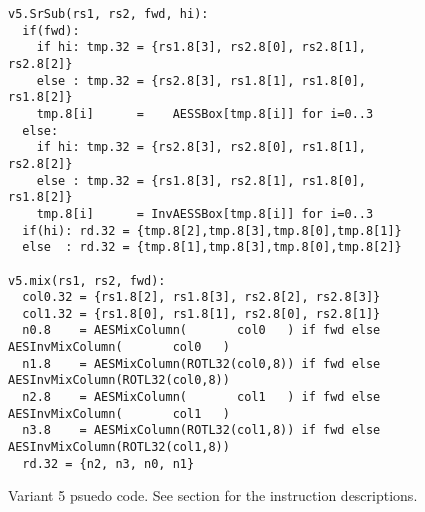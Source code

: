 \begin{figure}[!htb]
\begin{lstlisting}[language=pseudo,style=block]
v5.SrSub(rs1, rs2, fwd, hi):
  if(fwd):
    if hi: tmp.32 = {rs1.8[3], rs2.8[0], rs2.8[1], rs2.8[2]}
    else : tmp.32 = {rs2.8[3], rs1.8[1], rs1.8[0], rs1.8[2]}
    tmp.8[i]      =    AESSBox[tmp.8[i]] for i=0..3
  else:
    if hi: tmp.32 = {rs2.8[3], rs2.8[0], rs1.8[1], rs2.8[2]}
    else : tmp.32 = {rs1.8[3], rs2.8[1], rs1.8[0], rs1.8[2]}
    tmp.8[i]      = InvAESSBox[tmp.8[i]] for i=0..3
  if(hi): rd.32 = {tmp.8[2],tmp.8[3],tmp.8[0],tmp.8[1]}
  else  : rd.32 = {tmp.8[1],tmp.8[3],tmp.8[0],tmp.8[2]}

v5.mix(rs1, rs2, fwd):
  col0.32 = {rs1.8[2], rs1.8[3], rs2.8[2], rs2.8[3]}
  col1.32 = {rs1.8[0], rs1.8[1], rs2.8[0], rs2.8[1]}
  n0.8    = AESMixColumn(       col0   ) if fwd else AESInvMixColumn(       col0   )
  n1.8    = AESMixColumn(ROTL32(col0,8)) if fwd else AESInvMixColumn(ROTL32(col0,8))
  n2.8    = AESMixColumn(       col1   ) if fwd else AESInvMixColumn(       col1   )
  n3.8    = AESMixColumn(ROTL32(col1,8)) if fwd else AESInvMixColumn(ROTL32(col1,8))
  rd.32 = {n2, n3, n0, n1}
\end{lstlisting}
\caption{
    Variant 5 psuedo code.
    See section  for the instruction
    descriptions.
}
\label{fig:pseudo:v5}
\end{figure}

